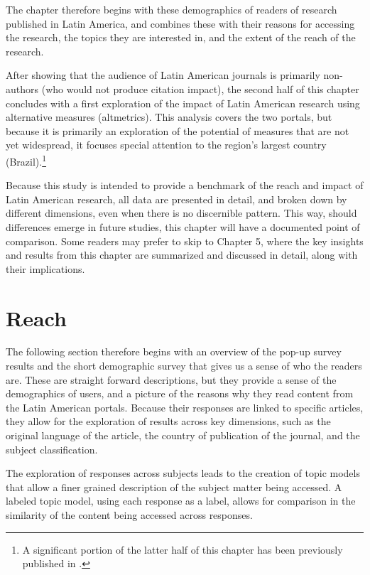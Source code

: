 The chapter therefore begins with these demographics of readers of research published in Latin America, and combines these with their reasons for accessing the research, the topics they are interested in, and the extent of the reach of the research.

After showing that the audience of Latin American journals is primarily non-authors (who would not produce citation impact), the second half of this chapter concludes with a first exploration of the impact of Latin American research using alternative measures (altmetrics). This analysis covers the two portals, but because it is primarily an exploration of the potential of measures that are not yet widespread, it focuses special attention to the region's largest country (Brazil).\footnote{A significant portion of the latter half of this chapter has been previously published in  \citet{Alperin2015b}.}

Because this study is intended to provide a benchmark of the reach and impact of Latin American research, all data are presented in detail, and broken down by different dimensions, even when there is no discernible pattern. This way, should differences emerge in future studies, this chapter will have a documented point of comparison. Some readers may prefer to skip to Chapter 5, where the key insights and results from this chapter are summarized and discussed in detail, along with their implications.

\section{Reach}
\label{reach}

The following section therefore begins with an overview of the pop-up survey results and the short demographic survey that gives us a sense of who the readers are. These are straight forward descriptions, but they provide a sense of the demographics of users, and a picture of the reasons why they read content from the Latin American portals. Because their responses are linked to specific articles, they allow for the exploration of results across key dimensions, such as the original language of the article, the country of publication of the journal, and the subject classification.

The exploration of responses across subjects leads to the creation of topic models that allow a finer grained description of the subject matter being accessed. A labeled topic model, using each response as a label, allows for comparison in the similarity of the content being accessed across responses.

